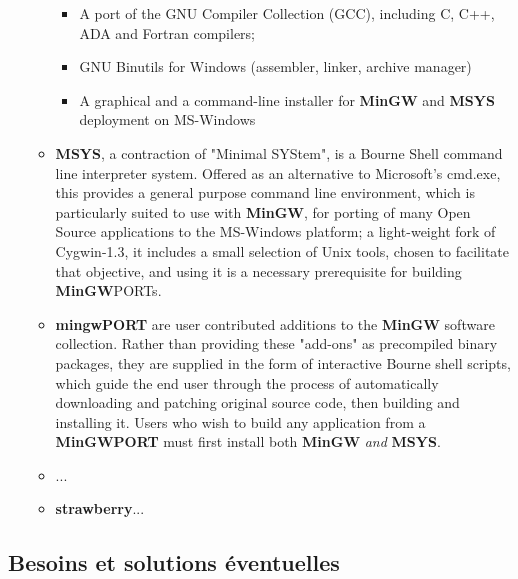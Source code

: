 \documentclass[11pt,twoside,a4paper]{article}
\begin{document}
\begin{itemize}
\begin{itemize}
		\begin{itemize}
			\item A port of the GNU Compiler Collection (GCC), including C, C++, ADA and Fortran compilers;
			\item GNU Binutils for Windows (assembler, linker, archive manager)
			\item A graphical and a command-line installer for \textbf{MinGW} and \textbf{MSYS} deployment on MS-Windows
		\end{itemize}
		\item \textbf{MSYS}, a contraction of "Minimal SYStem", is a Bourne Shell command line interpreter system. Offered as an alternative to Microsoft's cmd.exe, this provides a general purpose command line environment, which is particularly suited to use with \textbf{MinGW}, for porting of many Open Source applications to the MS-Windows platform; a light-weight fork of Cygwin-1.3, it includes a small selection of Unix tools, chosen to facilitate that objective, and using it is a necessary prerequisite for building \textbf{MinGW}PORTs.
		\item \textbf{mingwPORT} are user contributed additions to the \textbf{MinGW} software collection. Rather than providing these "add-ons" as precompiled binary packages, they are supplied in the form of interactive Bourne shell scripts, which guide the end user through the process of automatically downloading and patching original source code, then building and installing it. Users who wish to build any application from a \textbf{MinGWPORT} must first install both \textbf{MinGW} \emph{and} \textbf{MSYS}.
		\item ...
		\item \textbf{strawberry}...
	\end{itemize}
\end{itemize}

\clearpage

\subsection{Besoins et solutions {\'e}ventuelles}
\end{document}
